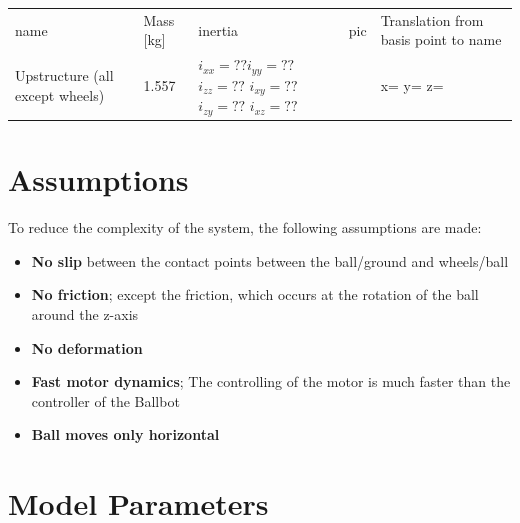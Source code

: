 \documentclass[twoside,colorback,accentcolor=tud4c,11pt]{tudreport}
\begin{document}
	\begin{tabular}{l l p{15mm} l p{60mm}}
		name & Mass [kg] & inertia & pic &Translation from basis point to name\\
		Upstructure (all except wheels)&1.557 &$i_{xx}=??$\newline $i_{yy}=??$
		\newline $i_{zz}=??$ \newline $i_{xy}=??$ \newline $i_{zy}=??$ \newline $i_{xz}=??$& &x= \newline y= \newline z= \\
	\end{tabular}
	
	\section{Assumptions}
	
	To reduce the complexity of the system, the following assumptions are made: 
	
	\begin{itemize}
		\item \textbf{No slip} between the contact points between the ball/ground and wheels/ball
		\item \textbf{No friction}; except the friction, which occurs at the rotation of the ball around the z-axis
		\item \textbf{No deformation}
		\item \textbf{Fast motor dynamics}; The controlling of the motor is much faster than the controller of the Ballbot
		\item \textbf{Ball moves only horizontal}
	\end{itemize}
	
	\section{Model Parameters}
	
\end{document}
